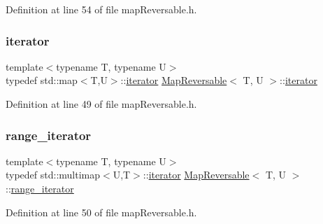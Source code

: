 Definition at line 54 of file map\+Reversable.\+h.

\mbox{\label{classMapReversable_af0fbc4d04214f278af7094f5db9133f3}} 
\subsubsection{\texorpdfstring{iterator}{iterator}}
{\footnotesize\ttfamily template$<$typename T, typename U$>$ \\
typedef std\+::map$<$T,U$>$\+::\hyperlink{classMapReversable_af0fbc4d04214f278af7094f5db9133f3}{iterator} \hyperlink{classMapReversable}{Map\+Reversable}$<$ T, U $>$\+::\hyperlink{classMapReversable_af0fbc4d04214f278af7094f5db9133f3}{iterator}\hspace{0.3cm}{\ttfamily [private]}}



Definition at line 49 of file map\+Reversable.\+h.

\mbox{\label{classMapReversable_a1c18ca6fe9f9890e5ad63aedf3eca6d7}} 
\subsubsection{\texorpdfstring{range\+\_\+iterator}{range\_iterator}}
{\footnotesize\ttfamily template$<$typename T, typename U$>$ \\
typedef std\+::multimap$<$U,T$>$\+::\hyperlink{classMapReversable_af0fbc4d04214f278af7094f5db9133f3}{iterator} \hyperlink{classMapReversable}{Map\+Reversable}$<$ T, U $>$\+::\hyperlink{classMapReversable_a1c18ca6fe9f9890e5ad63aedf3eca6d7}{range\+\_\+iterator}\hspace{0.3cm}{\ttfamily [private]}}



Definition at line 50 of file map\+Reversable.\+h.

\mbox{\label{classMapReversable_aed8c3cc9e7a8601664db79d56d117adf}} 
